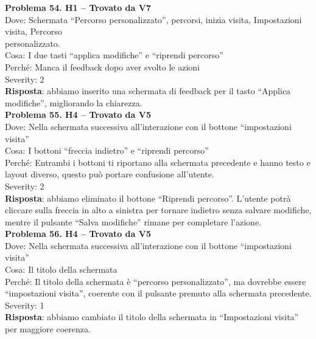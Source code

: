 \documentclass{article}
\begin{document}
\noindent \textbf{Problema 54. H1 – Trovato da V7} \\
Dove: Schermata “Percorso personalizzato”, percorsi, inizia visita, Impostazioni visita, Percorso\\  personalizzato. \\
Cosa: I due tasti “applica modifiche” e “riprendi percorso” \\
Perché: Manca il feedback dopo aver svolto le azioni \\
Severity: 2 \\
\textbf{Risposta}: abbiamo inserito una schermata di feedback per il tasto “Applica modifiche”, migliorando la chiarezza.\\

\noindent \textbf{Problema 55. H4 – Trovato da V5} \\
Dove: Nella schermata successiva all’interazione con il bottone “impostazioni visita” \\
Cosa: I bottoni “freccia indietro” e “riprendi percorso” \\
Perché: Entrambi i bottoni ti riportano alla schermata precedente e hanno testo e layout diverso, questo può portare confusione all’utente. \\
Severity: 2 \\
\textbf{Risposta}: abbiamo eliminato il bottone “Riprendi percorso”. L’utente potrà cliccare sulla freccia in alto a sinistra per tornare indietro senza salvare modifiche, mentre il pulsante “Salva modifiche” rimane per completare l’azione.\\

\noindent \textbf{Problema 56. H4 – Trovato da V5} \\
Dove: Nella schermata successiva all’interazione con il bottone “impostazioni visita” \\
Cosa: Il titolo della schermata \\
Perché: Il titolo della schermata è “percorso personalizzato”, ma dovrebbe essere “impostazioni visita”, coerente con il pulsante premuto alla schermata precedente. \\
Severity: 1 \\
\textbf{Risposta}: abbiamo cambiato il titolo della schermata in “Impostazioni visita” per maggiore coerenza.\\
\end{document}
